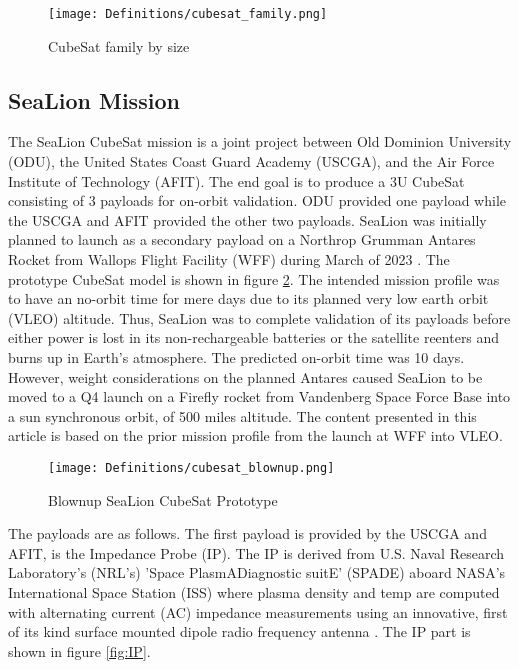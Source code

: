 \documentclass[journal,article,submit,pdftex,moreauthors]{Definitions/mdpi}
\begin{document}
\begin{figure}[H]
    \texttt{[image: Definitions/cubesat\_family.png]}
    \caption{CubeSat family by size \cite{cds_rev14}}
	\label{fig:cubesat_family}
    \end{figure}   
\unskip

\subsection{SeaLion Mission}
The SeaLion CubeSat mission is a joint project between Old Dominion University (ODU), the United States Coast Guard Academy (USCGA), and the Air Force Institute of Technology (AFIT).  The end goal is to produce a 3U CubeSat consisting of 3 payloads for on-orbit validation.  ODU provided one payload while the USCGA and AFIT provided the other two payloads.  SeaLion was initially planned to launch as a secondary payload on a Northrop Grumman Antares Rocket from Wallops Flight Facility (WFF) during March of 2023 \cite{sealion_cdr}.  The prototype CubeSat model is shown in figure \ref{fig:cubesat_blowup}.  The intended mission profile was to have an no-orbit time for mere days due to its planned very low earth orbit (VLEO) altitude.  Thus, SeaLion was to complete validation of its payloads before either power is lost in its non-rechargeable batteries or the satellite reenters and burns up in Earth's atmosphere.  The predicted on-orbit time was 10 days.  However, weight considerations on the planned Antares caused SeaLion to be moved to a Q4 launch on a Firefly rocket from Vandenberg Space Force Base into a sun synchronous orbit, of 500 miles altitude.  The content presented in this article is based on the prior mission profile from the launch at WFF into VLEO.

\begin{figure}[H]
    \texttt{[image: Definitions/cubesat\_blownup.png]}
    \caption{Blownup SeaLion CubeSat Prototype}
	\label{fig:cubesat_blowup}
    \end{figure}
	\noindent   
\unskip

The payloads are as follows. The first payload is provided by the USCGA and AFIT, is the Impedance Probe (IP).  The IP is derived from U.S. Naval Research Laboratory's (NRL's) 'Space PlasmADiagnostic suitE' (SPADE) aboard NASA's International Space Station (ISS) where plasma density and temp are computed with alternating current (AC) impedance measurements using an innovative, first of its kind surface mounted dipole radio frequency antenna \cite{sealion_cdr}.  The IP part is shown in figure \ref{fig:IP}.
\end{document}
